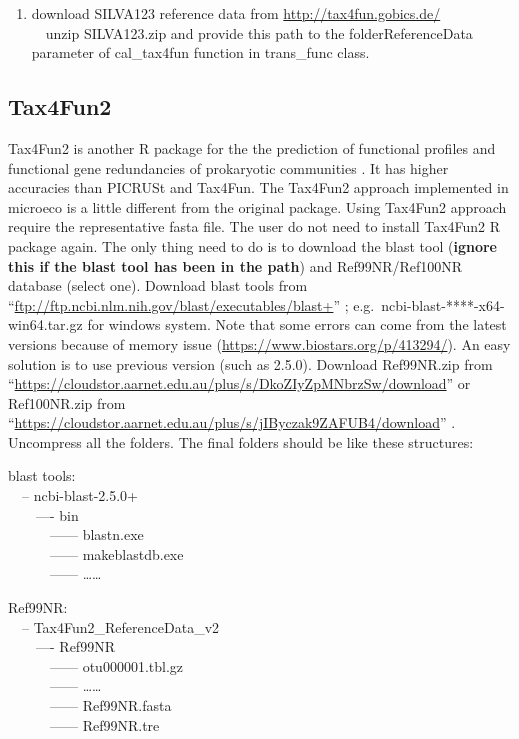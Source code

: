\documentclass[
]{book}
\providecommand{\tightlist}{%
  \setlength{\itemsep}{0pt}\setlength{\parskip}{0pt}}
\begin{document}
\begin{enumerate}
\def\labelenumi{\arabic{enumi}.}
\setcounter{enumi}{1}
\tightlist
\item
  download SILVA123 reference data from \url{http://tax4fun.gobics.de/}\\
  　unzip SILVA123.zip and provide this path to the folderReferenceData parameter of cal\_tax4fun function in trans\_func class.
\end{enumerate}

\hypertarget{tax4fun2}{%
\subsection{Tax4Fun2}\label{tax4fun2}}

Tax4Fun2 is another R package for the the prediction of functional profiles and functional gene redundancies of prokaryotic communities \citep{Wemheuer_Tax4Fun2_2020}.
It has higher accuracies than PICRUSt and Tax4Fun. The Tax4Fun2 approach implemented in microeco is a little different from the original package.
Using Tax4Fun2 approach require the representative fasta file.
The user do not need to install Tax4Fun2 R package again.
The only thing need to do is to download the blast tool (\textbf{ignore this if the blast tool has been in the path}) and Ref99NR/Ref100NR database (select one).
Download blast tools from ``\url{ftp://ftp.ncbi.nlm.nih.gov/blast/executables/blast+}'' ; e.g.~ncbi-blast-****-x64-win64.tar.gz for windows system.
Note that some errors can come from the latest versions because of memory issue (\url{https://www.biostars.org/p/413294/}).
An easy solution is to use previous version (such as 2.5.0).
Download Ref99NR.zip from ``\url{https://cloudstor.aarnet.edu.au/plus/s/DkoZIyZpMNbrzSw/download}'' or Ref100NR.zip from ``\url{https://cloudstor.aarnet.edu.au/plus/s/jIByczak9ZAFUB4/download}'' .
Uncompress all the folders. The final folders should be like these structures:

blast tools:\\
　\textbar-- ncbi-blast-2.5.0+\\
　　\textbar---- bin\\
　　　\textbar------ blastn.exe\\
　　　\textbar------ makeblastdb.exe\\
　　　\textbar------ \ldots\ldots{}

Ref99NR:\\
　\textbar-- Tax4Fun2\_ReferenceData\_v2\\
　　\textbar---- Ref99NR\\
　　　\textbar------ otu000001.tbl.gz\\
　　　\textbar------ \ldots\ldots{}\\
　　　\textbar------ Ref99NR.fasta\\
　　　\textbar------ Ref99NR.tre
\end{document}
